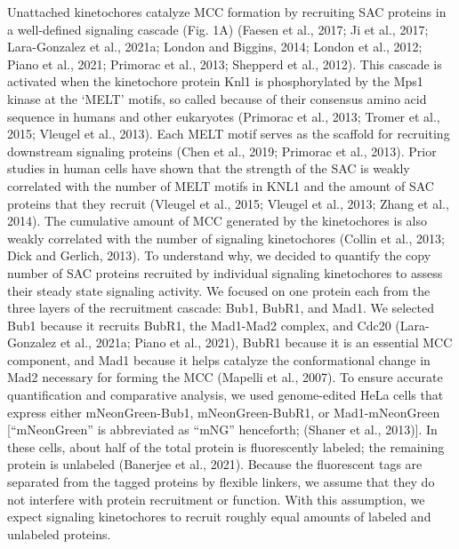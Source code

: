 Unattached kinetochores catalyze MCC formation by recruiting SAC proteins in a well-defined signaling cascade (Fig. 1A) (Faesen et al., 2017; Ji et al., 2017; Lara-Gonzalez et al., 2021a; London and Biggins, 2014; London et al., 2012; Piano et al., 2021; Primorac et al., 2013; Shepperd et al., 2012). This cascade is activated when the kinetochore protein Knl1 is phosphorylated by the Mps1 kinase at the ‘MELT’ motifs, so called because of their consensus amino acid sequence in humans and other eukaryotes (Primorac et al., 2013; Tromer et al., 2015; Vleugel et al., 2013). Each MELT motif serves as the scaffold for recruiting downstream signaling proteins (Chen et al., 2019; Primorac et al., 2013). Prior studies in human cells have shown that the strength of the SAC is weakly correlated with the number of MELT motifs in KNL1 and the amount of SAC proteins that they recruit (Vleugel et al., 2015; Vleugel et al., 2013; Zhang et al., 2014). The cumulative amount of MCC generated by the kinetochores is also weakly correlated with the number of signaling kinetochores (Collin et al., 2013; Dick and Gerlich, 2013). To understand why, we decided to quantify the copy number of SAC proteins recruited by individual signaling kinetochores to assess their steady state signaling activity. We focused on one protein each from the three layers of the recruitment cascade: Bub1, BubR1, and Mad1. We selected Bub1 because it recruits BubR1, the Mad1-Mad2 complex, and Cdc20 (Lara-Gonzalez et al., 2021a; Piano et al., 2021), BubR1 because it is an essential MCC component, and Mad1 because it helps catalyze the conformational change in Mad2 necessary for forming the MCC (Mapelli et al., 2007). 
To ensure accurate quantification and comparative analysis, we used genome-edited HeLa cells that express either mNeonGreen-Bub1, mNeonGreen-BubR1, or Mad1-mNeonGreen [“mNeonGreen” is abbreviated as “mNG” henceforth; (Shaner et al., 2013)]. In these cells, about half of the total protein is fluorescently labeled; the remaining protein is unlabeled (Banerjee et al., 2021). Because the fluorescent tags are separated from the tagged proteins by flexible linkers, we assume that they do not interfere with protein recruitment or function. With this assumption, we expect signaling kinetochores to recruit roughly equal amounts of labeled and unlabeled proteins. 
